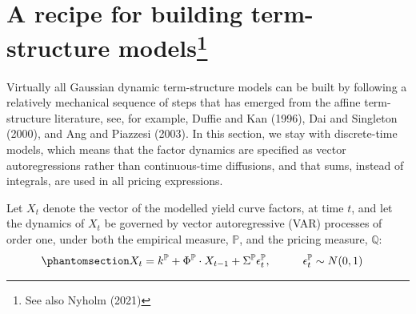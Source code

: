 \documentclass[
  letterpaper,
  DIV=11,
  numbers=noendperiod]{scrreprt}
\begin{document}
\section[A recipe for building term-structure models]{\texorpdfstring{A
recipe for building term-structure
models\footnote{See also Nyholm (2021)}}{A recipe for building term-structure models}}\label{a-recipe-for-building-term-structure-models9}

Virtually all Gaussian dynamic term-structure models can be built by
following a relatively mechanical sequence of steps that has emerged
from the affine term-structure literature, see, for example, Duffie and
Kan (1996), Dai and Singleton (2000), and Ang and Piazzesi (2003). In
this section, we stay with discrete-time models, which means that the
factor dynamics are specified as vector autoregressions rather than
continuous-time diffusions, and that sums, instead of integrals, are
used in all pricing expressions.

Let \(X_t\) denote the vector of the modelled yield curve factors, at
time \(t\), and let the dynamics of \(X_t\) be governed by vector
autoregressive (VAR) processes of order one, under both the empirical
measure, \(\mathbb{P}\), and the pricing measure, \(\mathbb{Q}\):
\begin{equation}\protect\phantomsection\label{eq-factorVarP}{
\begin{align}
    X_{t} &= k^\mathbb{P}+\Phi^\mathbb{P} \cdot X_{t-1} + \Sigma^{\mathbb{P}} \epsilon^\mathbb{P}_{t}, \hspace{1cm} \epsilon^\mathbb{P}_{t} \sim N(0,1)  
\end{align}
}\end{equation}
\end{document}
